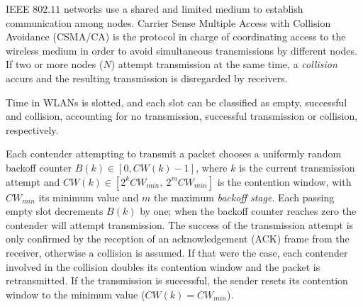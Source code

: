IEEE $802.11$ networks use a shared and limited medium to establish communication among nodes. Carrier Sense Multiple Access with Collision Avoidance (CSMA/CA) is the protocol in charge of coordinating access to the wireless medium in order to avoid simultaneous transmissions by different nodes. If two or more nodes ($N$) attempt transmission at the same time, a \emph{collision} accurs and the resulting transmission is disregarded by receivers.

Time in WLANs is slotted, and each slot can be classified as empty, successful and collision, accounting for no transmission, successful transmission or collision, respectively.


Each contender attempting to transmit a packet chooses a uniformly random backoff counter $B(k)\in[0,CW(k)-1]$, where $k$ is the current transmission attempt and $CW(k)\in[2^{k}CW_{min},~2^{m}CW_{min}]$ is the contention window, with $CW_{min}$ its minimum value and $m$ the maximum \emph{backoff stage}. Each passing empty slot decrements $B(k)$ by one; when the backoff counter reaches zero the contender will attempt transmission. The success of the transmission attempt is only confirmed by the reception of an acknowledgement (ACK) frame from the receiver, otherwise a collision is assumed. If that were the case, each contender involved in the collision doubles its contention window and the packet is retransmitted. If the transmission is successful, the sender resets its contention window to the minimum value ($CW(k)=CW_{min}$).


